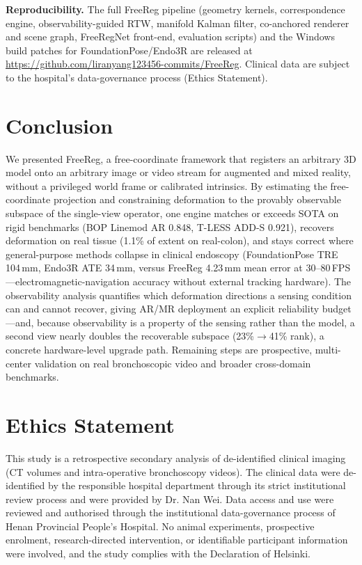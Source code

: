 \documentclass[9pt,twoside,web]{ieeecolor2}
\begin{document}
\textbf{Reproducibility.} The full FreeReg pipeline (geometry kernels, correspondence engine, observability-guided RTW, manifold Kalman filter, co-anchored renderer and scene graph, FreeRegNet front-end, evaluation scripts) and the Windows build patches for FoundationPose/Endo3R are released at \url{https://github.com/liranyang123456-commits/FreeReg}. Clinical data are subject to the hospital's data-governance process (Ethics Statement).

\section{Conclusion}\label{sec:conclusion}
We presented FreeReg, a free-coordinate framework that registers an arbitrary 3D model onto an arbitrary image or video stream for augmented and mixed reality, without a privileged world frame or calibrated intrinsics. By estimating the free-coordinate projection and constraining deformation to the provably observable subspace of the single-view operator, one engine matches or exceeds SOTA on rigid benchmarks (BOP Linemod AR 0.848, T-LESS ADD-S 0.921), recovers deformation on real tissue (1.1\% of extent on real-colon), and stays correct where general-purpose methods collapse in clinical endoscopy (FoundationPose TRE 104\,mm, Endo3R ATE 34\,mm, versus FreeReg 4.23\,mm mean error at 30--80\,FPS---electromagnetic-navigation accuracy without external tracking hardware). The observability analysis quantifies which deformation directions a sensing condition can and cannot recover, giving AR/MR deployment an explicit reliability budget---and, because observability is a property of the sensing rather than the model, a second view nearly doubles the recoverable subspace (23\%$\to$41\% rank), a concrete hardware-level upgrade path. Remaining steps are prospective, multi-center validation on real bronchoscopic video and broader cross-domain benchmarks.

\section*{Ethics Statement}
This study is a retrospective secondary analysis of de-identified clinical imaging (CT volumes and intra-operative bronchoscopy videos). The clinical data were de-identified by the responsible hospital department through its strict institutional review process and were provided by Dr. Nan Wei. Data access and use were reviewed and authorised through the institutional data-governance process of Henan Provincial People's Hospital. No animal experiments, prospective enrolment, research-directed intervention, or identifiable participant information were involved, and the study complies with the Declaration of Helsinki.
\end{document}
